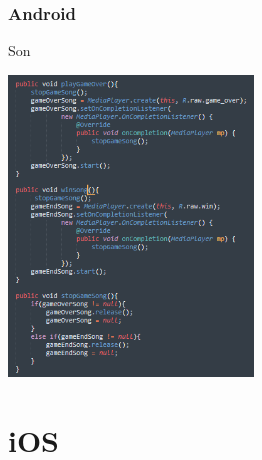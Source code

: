 \documentclass{beamer}
\begin{document}
\begin{frame}
\frametitle{Android}
\begin{block}{Son}

      \includegraphics[width=65mm]{Capture2}
      

\end{block}

\end{frame}

\section{iOS}
\end{document}
